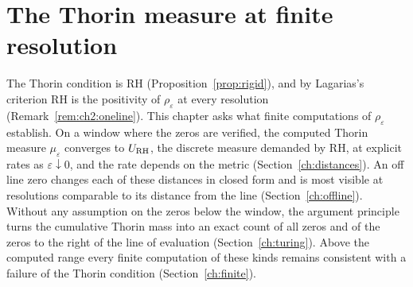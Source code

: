 \chapter{The Thorin measure at finite resolution}\label{chap:measure}

The Thorin condition is RH (Proposition~\ref{prop:rigid}), and by Lagarias's criterion RH is the positivity of $\rho_\varepsilon$ at every resolution (Remark~\ref{rem:ch2:oneline}). This chapter asks what finite computations of $\rho_\varepsilon$ establish. On a window where the zeros are verified, the computed Thorin measure $\mu_\varepsilon$ converges to $U_{\mathrm{RH}}$, the discrete measure demanded by RH, at explicit rates as $\varepsilon\downarrow0$, and the rate depends on the metric (Section~\ref{ch:distances}). An off line zero changes each of these distances in closed form and is most visible at resolutions comparable to its distance from the line (Section~\ref{ch:offline}). Without any assumption on the zeros below the window, the argument principle turns the cumulative Thorin mass into an exact count of all zeros and of the zeros to the right of the line of evaluation (Section~\ref{ch:turing}). Above the computed range every finite computation of these kinds remains consistent with a failure of the Thorin condition (Section~\ref{ch:finite}).
